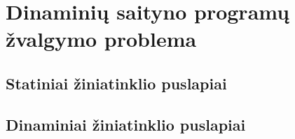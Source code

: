 \section{Dinaminių saityno programų žvalgymo problema}
\subsection{Statiniai žiniatinklio puslapiai}
\subsection{Dinaminiai žiniatinklio puslapiai}